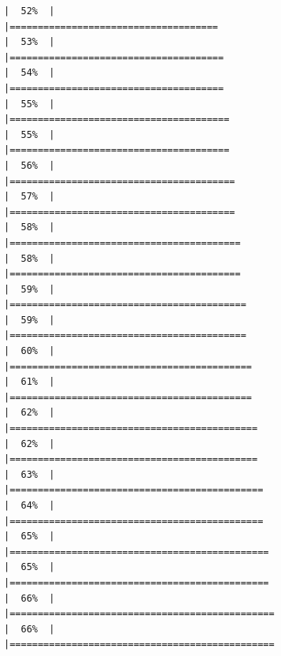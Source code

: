 \documentclass[
  english,
  man,a4paper,mask,floatsintext]{apa6}
\begin{document}
\begin{verbatim}
|  52%  |                                                                              |=====================================                                 |  53%  |                                                                              |======================================                                |  54%  |                                                                              |======================================                                |  55%  |                                                                              |=======================================                               |  55%  |                                                                              |=======================================                               |  56%  |                                                                              |========================================                              |  57%  |                                                                              |========================================                              |  58%  |                                                                              |=========================================                             |  58%  |                                                                              |=========================================                             |  59%  |                                                                              |==========================================                            |  59%  |                                                                              |==========================================                            |  60%  |                                                                              |===========================================                           |  61%  |                                                                              |===========================================                           |  62%  |                                                                              |============================================                          |  62%  |                                                                              |============================================                          |  63%  |                                                                              |=============================================                         |  64%  |                                                                              |=============================================                         |  65%  |                                                                              |==============================================                        |  65%  |                                                                              |==============================================                        |  66%  |                                                                              |===============================================                       |  66%  |                                                                              |===============================================                       
\end{verbatim}
\end{document}
